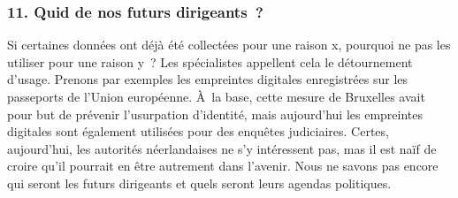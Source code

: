\subsubsection{11. Quid de nos futurs dirigeants ?}
Si certaines données ont déjà été collectées pour une raison x, pourquoi ne pas les utiliser pour une raison y ? Les spécialistes appellent cela le détournement d'usage. Prenons par exemples les empreintes digitales enregistrées sur les passeports de l'Union européenne. À la base, cette mesure de Bruxelles avait pour but de prévenir l'usurpation d'identité, mais aujourd'hui les empreintes digitales sont également utilisées pour des enquêtes judiciaires. Certes, aujourd'hui, les autorités néerlandaises ne s'y intéressent pas, mas il est naïf de croire qu'il pourrait en être autrement dans l'avenir. Nous ne savons pas encore qui seront les futurs dirigeants et quels seront leurs agendas politiques.
